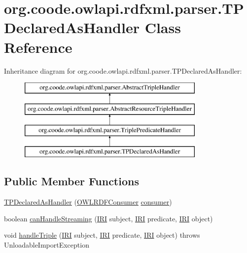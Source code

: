 \hypertarget{classorg_1_1coode_1_1owlapi_1_1rdfxml_1_1parser_1_1_t_p_declared_as_handler}{\section{org.\-coode.\-owlapi.\-rdfxml.\-parser.\-T\-P\-Declared\-As\-Handler Class Reference}
\label{classorg_1_1coode_1_1owlapi_1_1rdfxml_1_1parser_1_1_t_p_declared_as_handler}
}
Inheritance diagram for org.\-coode.\-owlapi.\-rdfxml.\-parser.\-T\-P\-Declared\-As\-Handler\-:\begin{figure}[H]
\begin{center}
\leavevmode
\includegraphics[height=4.000000cm]{classorg_1_1coode_1_1owlapi_1_1rdfxml_1_1parser_1_1_t_p_declared_as_handler}
\end{center}
\end{figure}
\subsection*{Public Member Functions}
\begin{DoxyCompactItemize}
\item 
\hyperlink{classorg_1_1coode_1_1owlapi_1_1rdfxml_1_1parser_1_1_t_p_declared_as_handler_a88c8182b29f1de0f0537a13e0cdf7752}{T\-P\-Declared\-As\-Handler} (\hyperlink{classorg_1_1coode_1_1owlapi_1_1rdfxml_1_1parser_1_1_o_w_l_r_d_f_consumer}{O\-W\-L\-R\-D\-F\-Consumer} \hyperlink{classorg_1_1coode_1_1owlapi_1_1rdfxml_1_1parser_1_1_abstract_triple_handler_a4ccf4d898ff01eb1cadfa04b23d54e9c}{consumer})
\item 
boolean \hyperlink{classorg_1_1coode_1_1owlapi_1_1rdfxml_1_1parser_1_1_t_p_declared_as_handler_abe77170eabfba16b4606ca4f9f089728}{can\-Handle\-Streaming} (\hyperlink{classorg_1_1semanticweb_1_1owlapi_1_1model_1_1_i_r_i}{I\-R\-I} subject, \hyperlink{classorg_1_1semanticweb_1_1owlapi_1_1model_1_1_i_r_i}{I\-R\-I} predicate, \hyperlink{classorg_1_1semanticweb_1_1owlapi_1_1model_1_1_i_r_i}{I\-R\-I} object)
\item 
void \hyperlink{classorg_1_1coode_1_1owlapi_1_1rdfxml_1_1parser_1_1_t_p_declared_as_handler_a8c5d315e59c4f2f623c372c794373312}{handle\-Triple} (\hyperlink{classorg_1_1semanticweb_1_1owlapi_1_1model_1_1_i_r_i}{I\-R\-I} subject, \hyperlink{classorg_1_1semanticweb_1_1owlapi_1_1model_1_1_i_r_i}{I\-R\-I} predicate, \hyperlink{classorg_1_1semanticweb_1_1owlapi_1_1model_1_1_i_r_i}{I\-R\-I} object)  throws Unloadable\-Import\-Exception 
\end{DoxyCompactItemize}
